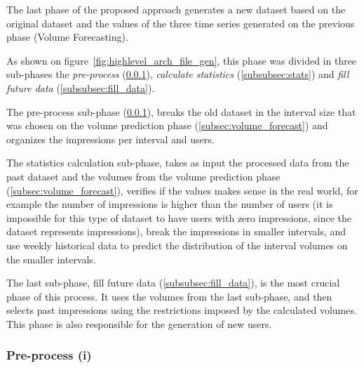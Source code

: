 The last phase of the proposed approach generates a new dataset based on the
original dataset and the values of the three time series generated on the
previous phase (Volume Forecasting).

As shown on figure~\ref{fig:highlevel_arch_file_gen}, this phase was divided in
three sub-phases the \emph{pre-process} (\ref{subsubsec:pre_process}), \emph{calculate
statistics} (\ref{subsubsec:stats}) and \emph{fill future data}
(\ref{subsubsec:fill_data}).

The pre-process sub-phase (\ref{subsubsec:pre_process}), breaks the old dataset in
the interval size that was chosen on the volume prediction phase
(\ref{subsec:volume_forecast}) and organizes the impressions per interval and
users.

The statistics calculation sub-phase, takes as input the processed data
from the past dataset and the volumes from the volume prediction phase
(\ref{subsec:volume_forecast}), verifies if the values makes sense in the real
world, for example the number of impressions is higher than the number of users
(it is impossible for this type of dataset to have users with zero impressions,
since the dataset represents impressions), break the impressions in smaller
intervals, and use weekly historical data to predict the distribution of the
interval volumes on the smaller intervals.

The last sub-phase, fill future data (\ref{subsubsec:fill_data}), is the most
crucial phase of this process. It uses the volumes from the last sub-phase, and
then selects past impressions using the restrictions imposed by the calculated volumes. This
phase is also responsible for the generation of new users.

\subsubsection{Pre-process (i)}\label{subsubsec:pre_process}

